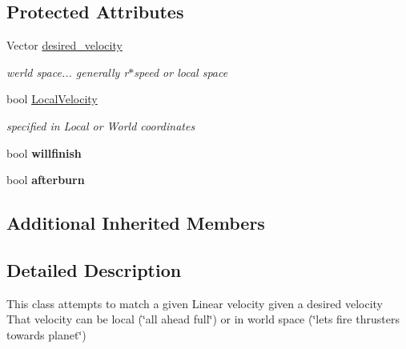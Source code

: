 \subsection*{Protected Attributes}
\begin{DoxyCompactItemize}
\item 
Vector \hyperlink{classOrders_1_1MatchLinearVelocity_a07032cadaa53c404682880a3bfcbaf82}{desired\+\_\+velocity}\hypertarget{classOrders_1_1MatchLinearVelocity_a07032cadaa53c404682880a3bfcbaf82}{}\label{classOrders_1_1MatchLinearVelocity_a07032cadaa53c404682880a3bfcbaf82}

\begin{DoxyCompactList}\small\item\em werld space... generally r$\ast$speed or local space \end{DoxyCompactList}\item 
bool \hyperlink{classOrders_1_1MatchLinearVelocity_abc2e0e14fce0e308cf72baaacc12dafd}{Local\+Velocity}\hypertarget{classOrders_1_1MatchLinearVelocity_abc2e0e14fce0e308cf72baaacc12dafd}{}\label{classOrders_1_1MatchLinearVelocity_abc2e0e14fce0e308cf72baaacc12dafd}

\begin{DoxyCompactList}\small\item\em specified in Local or World coordinates \end{DoxyCompactList}\item 
bool {\bfseries willfinish}\hypertarget{classOrders_1_1MatchLinearVelocity_a06be86ec3cc2d76c381e66daf20d2172}{}\label{classOrders_1_1MatchLinearVelocity_a06be86ec3cc2d76c381e66daf20d2172}

\item 
bool {\bfseries afterburn}\hypertarget{classOrders_1_1MatchLinearVelocity_a9dc25fd04a37ce5bcc26fe6921eeb4cf}{}\label{classOrders_1_1MatchLinearVelocity_a9dc25fd04a37ce5bcc26fe6921eeb4cf}

\end{DoxyCompactItemize}
\subsection*{Additional Inherited Members}


\subsection{Detailed Description}
This class attempts to match a given Linear velocity given a desired velocity That velocity can be local (\char`\"{}all ahead full\char`\"{}) or in world space (\char`\"{}lets fire thrusters towards planet\char`\"{}) 

